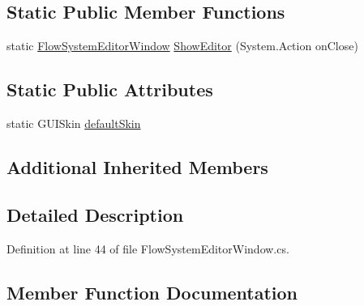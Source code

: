 \subsection*{Static Public Member Functions}
\begin{DoxyCompactItemize}
\item 
static \hyperlink{class_unity_editor_1_1_u_i_1_1_windows_1_1_plugins_1_1_flow_1_1_flow_system_editor_window}{Flow\+System\+Editor\+Window} \hyperlink{class_unity_editor_1_1_u_i_1_1_windows_1_1_plugins_1_1_flow_1_1_flow_system_editor_window_af3a2ff5ad6819e70d16aa7df82544844}{Show\+Editor} (System.\+Action on\+Close)
\end{DoxyCompactItemize}
\subsection*{Static Public Attributes}
\begin{DoxyCompactItemize}
\item 
static G\+U\+I\+Skin \hyperlink{class_unity_editor_1_1_u_i_1_1_windows_1_1_plugins_1_1_flow_1_1_flow_system_editor_window_a3ec228cb183cd40aa8664a1f78b0accb}{default\+Skin}
\end{DoxyCompactItemize}
\subsection*{Additional Inherited Members}


\subsection{Detailed Description}


Definition at line 44 of file Flow\+System\+Editor\+Window.\+cs.



\subsection{Member Function Documentation}
\hypertarget{class_unity_editor_1_1_u_i_1_1_windows_1_1_plugins_1_1_flow_1_1_flow_system_editor_window_a20e95f89886aa82d9e7b6daa2fe73978}{}
